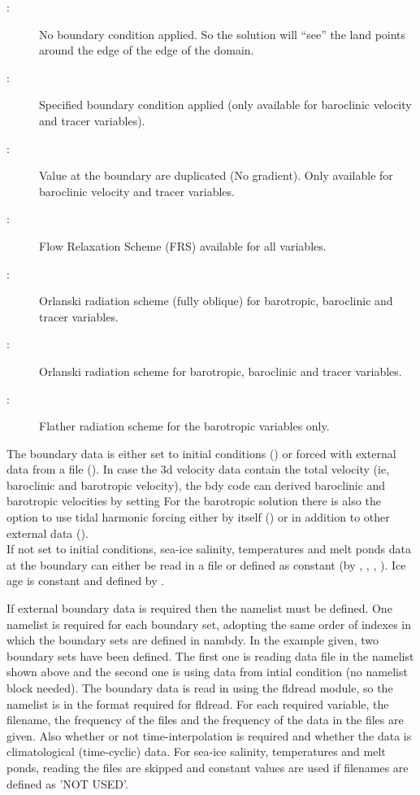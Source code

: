 \documentclass[../main/NEMO_manual]{subfiles}
\begin{document}
\begin{description}
\item [:] No boundary condition applied.
  So the solution will ``see'' the land points around the edge of the edge of the domain.
\item [:] Specified boundary condition applied (only available for baroclinic velocity and tracer variables).
\item [:] Value at the boundary are duplicated (No gradient). Only available for baroclinic velocity and tracer variables.
\item [:] Flow Relaxation Scheme (FRS) available for all variables.
\item [:] Orlanski radiation scheme (fully oblique) for barotropic, baroclinic and tracer variables.
\item [:] Orlanski radiation scheme for barotropic, baroclinic and tracer variables.
\item [:] Flather radiation scheme for the barotropic variables only.
\end{description}

The boundary data is either set to initial conditions
() or forced with external data from a file ().
In case the 3d velocity data contain the total velocity (ie, baroclinic and barotropic velocity),
the bdy code can derived baroclinic and barotropic velocities by setting 
For the barotropic solution there is also the option to use tidal harmonic forcing either by
itself () or in addition to other external data ().\\
If not set to initial conditions, sea-ice salinity, temperatures and melt ponds data at the boundary can either be read in a file or defined as constant (by , , , ). Ice age is constant and defined by .

If external boundary data is required then the  namelist must be defined.
One  namelist is required for each boundary set, adopting the same order of indexes in which the boundary sets are defined in nambdy.
In the example given, two boundary sets have been defined. The first one is reading data file in the  namelist shown above
and the second one is using data from intial condition (no namelist block needed).
The boundary data is read in using the fldread module,
so the  namelist is in the format required for fldread.
For each required variable, the filename, the frequency of the files and
the frequency of the data in the files are given.
Also whether or not time-interpolation is required and whether the data is climatological (time-cyclic) data.
For sea-ice salinity, temperatures and melt ponds, reading the files are skipped and constant values are used if filenames are defined as {'NOT USED'}.\\
\end{document}
